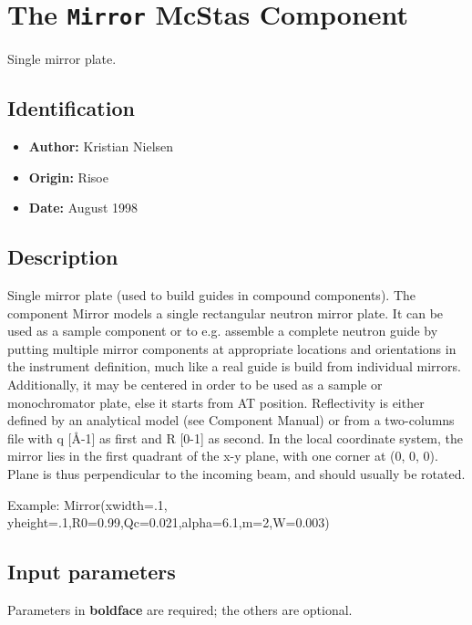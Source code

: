 \section{The \texttt{Mirror} McStas Component}
Single mirror plate.

\subsection*{Identification}
\begin{itemize}
  \item \textbf{Author:} Kristian Nielsen
  \item \textbf{Origin:} Risoe
  \item \textbf{Date:} August 1998
\end{itemize}

\subsection*{Description}
Single mirror plate (used to build guides in compound components). The component Mirror models a single rectangular neutron mirror plate. It can be used as a sample component or to e.g. assemble a complete neutron guide by putting multiple mirror components at appropriate locations and orientations in the instrument definition, much like a real guide is build from individual mirrors. Additionally, it may be centered in order to be used as a sample or monochromator plate, else it starts from AT position. Reflectivity is either defined by an analytical model (see Component Manual) or from a two-columns file with q [\AA{}-1] as first and R [0-1] as second. In the local coordinate system, the mirror lies in the first quadrant of the x-y plane, with one corner at (0, 0, 0). Plane is thus perpendicular to the incoming beam, and should usually be rotated.

Example: Mirror(xwidth=.1, yheight=.1,R0=0.99,Qc=0.021,alpha=6.1,m=2,W=0.003)

\subsection*{Input parameters}
Parameters in \textbf{boldface} are required; the others are optional.

